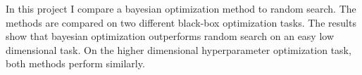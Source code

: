 In this project I compare a bayesian optimization method to random search. The methods are compared on two different black-box optimization tasks. The results show that bayesian optimization outperforms random search on an easy low dimensional task. On the higher dimensional hyperparameter optimization task, both methods perform similarly.
